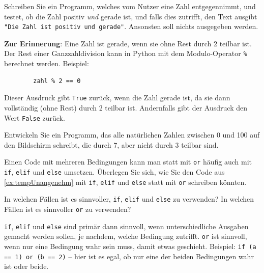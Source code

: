 \begin{myexercise}\label{ex:posUndGerade}
	Schreiben Sie ein Programm, welches vom Nutzer eine Zahl entgegennimmt, und testet, ob die Zahl positiv \textit{und} gerade ist, und falls dies zutrifft, den Text ausgibt \lstinline|"Die Zahl ist positiv und gerade"|. Ansonsten soll nichts ausgegeben werden.

	\textbf{Zur Erinnerung}: Eine Zahl ist gerade, wenn sie ohne Rest durch 2 teilbar ist. Der Rest einer Ganzzahldivision kann in Python mit dem Modulo-Operator \lstinline|%| berechnet werden. Beispiel:
	\begin{lstlisting}
		zahl % 2 == 0
	\end{lstlisting}
	Dieser Ausdruck gibt \lstinline|True| zurück, wenn die Zahl gerade ist, da sie dann vollständig (ohne Rest) durch 2 teilbar ist. Andernfalls gibt der Ausdruck den Wert \lstinline|False| zurück.


	\begin{myanswer}
		
	\end{myanswer}
\end{myexercise}

\begin{myexercise}
	Entwickeln Sie ein Programm, das alle natürlichen Zahlen zwischen 0 und 100 auf den Bildschirm schreibt, die durch 7, aber nicht durch 3 teilbar sind.
	\begin{myanswer}
		
	\end{myanswer}
\end{myexercise}

\begin{mychallenge}
	Einen Code mit mehreren Bedingungen kann man statt mit \lstinline|or| häufig auch mit \lstinline|if|, \lstinline|elif| und \lstinline|else| umsetzen. Überlegen Sie sich, wie Sie den Code aus \cref{ex:tempUnangenehm} mit \lstinline|if|, \lstinline|elif| und \lstinline|else| statt mit \lstinline|or| schreiben könnten.

	In welchen Fällen ist es sinnvoller, \lstinline|if|, \lstinline|elif| und \lstinline|else| zu verwenden? In welchen Fällen ist es sinnvoller \lstinline|or| zu verwenden?
	\begin{myanswer}
		\lstinline|if|, \lstinline|elif| und \lstinline|else| sind primär dann sinnvoll, wenn unterschiedliche Ausgaben gemacht werden sollen, je nachdem, welche Bedingung zutrifft. \lstinline|or| ist sinnvoll, wenn nur eine Bedingung wahr sein muss, damit etwas geschieht. Beispiel: \lstinline|if (a == 1) or (b == 2)| -- hier ist es egal, ob nur eine der beiden Bedingungen wahr ist oder beide.
	\end{myanswer}
\end{mychallenge}

